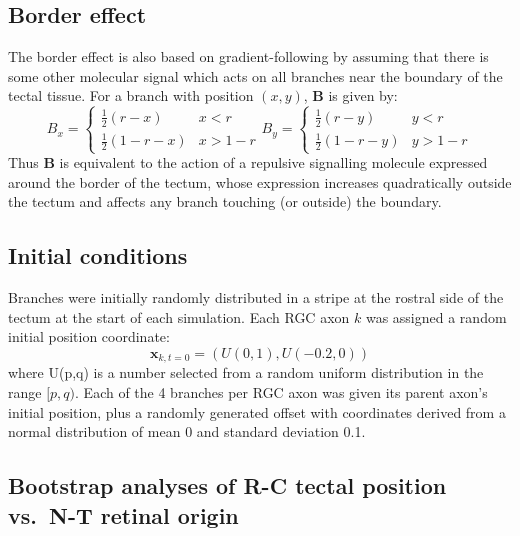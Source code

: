 \documentclass[11pt, a4paper]{article}
\begin{document}
\subsection*{Border effect} %
The border effect is also based on gradient-following by assuming that there is some other molecular signal which acts on all branches near the boundary of the tectal tissue. For a branch with position $(x,y)$, $\mathbf{B}$ is given by:
%
\begin{equation}\label{e:B}
B_x = \begin{cases}
        \frac{1}{2} (r-x)     & x<r \\
        \frac{1}{2} (1-r-x)    & x>1-r
\end{cases}
B_y = \begin{cases}
        \frac{1}{2} (r-y)      & y<r \\
        \frac{1}{2} (1-r-y)    & y>1-r
\end{cases}
\end{equation}
%
Thus $\mathbf{B}$ is equivalent to the action of a repulsive signalling molecule expressed around the border of the tectum, whose expression increases quadratically outside the tectum and affects any branch touching (or outside) the boundary.

\subsection*{Initial conditions}
Branches were initially randomly distributed in a stripe at the rostral side of the tectum at the start of each simulation. 
Each RGC axon $k$ was assigned a random initial position coordinate:
\begin{equation}\label{e:ic}
\mathbf{x}_{k,t=0} = (U(0,1), U(-0.2,0))
\end{equation}
where U(p,q) is a number selected from a random uniform distribution in the range $[p,q)$. Each of the 4 branches per RGC axon was given its parent axon's initial position, plus a randomly generated offset with coordinates derived from a normal distribution of mean 0 and standard deviation 0.1.

\subsection*{Bootstrap analyses of R-C tectal position vs.~N-T retinal origin}
\end{document}

